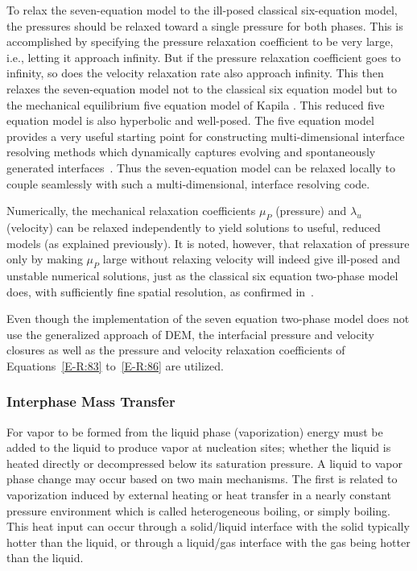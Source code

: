 To relax the seven-equation model to
the ill-posed classical six-equation model, the pressures should be
relaxed toward a single pressure for both phases.  This is
accomplished by specifying the pressure relaxation coefficient to be
very large, i.e., letting it approach infinity.  But if the pressure
relaxation coefficient goes to infinity, so does the velocity
relaxation rate also approach infinity.  This then relaxes the
seven-equation model not to the classical six equation model but to the
mechanical equilibrium five equation model of Kapila .  This reduced
five equation model is also hyperbolic and well-posed. The five equation
model provides a very useful starting point for constructing
multi-dimensional interface resolving methods which dynamically
captures evolving and spontaneously generated
interfaces~\cite{Saurel_2009}. Thus the seven-equation model
can be relaxed locally to couple seamlessly with such a
multi-dimensional, interface resolving code.

Numerically, the mechanical relaxation coefficients $\mu_P$
(pressure) and $\lambda_u$ (velocity) can be relaxed independently to
yield solutions to useful, reduced models (as explained previously).  It
is noted, however, that relaxation of pressure only by making $\mu_P$
large without relaxing velocity will indeed give ill-posed and
unstable numerical solutions, just as the classical six equation
two-phase model does, with sufficiently fine spatial resolution, as
confirmed in~\cite{SEM,Herrard_2005}.

Even though the implementation of the seven equation two-phase
model does not use
the generalized approach of DEM, the interfacial pressure and velocity
closures as well as the pressure and velocity relaxation coefficients
of Equations~\eqref{E-R:83} to~\eqref{E-R:86} are utilized.
\subsubsection{Interphase Mass Transfer}
For vapor to be formed from the liquid phase (vaporization) energy
must be added to the liquid to produce vapor at nucleation sites;
whether the liquid is heated directly or decompressed below its
saturation pressure.  A liquid to vapor phase change may occur based
on two main mechanisms.  The first is related to vaporization induced
by external heating or heat transfer in a nearly constant pressure
environment which is called heterogeneous boiling, or simply
boiling.  This heat input can occur through a solid/liquid
interface with the solid typically hotter than the liquid, or through
a liquid/gas interface with the gas being hotter than the liquid.


